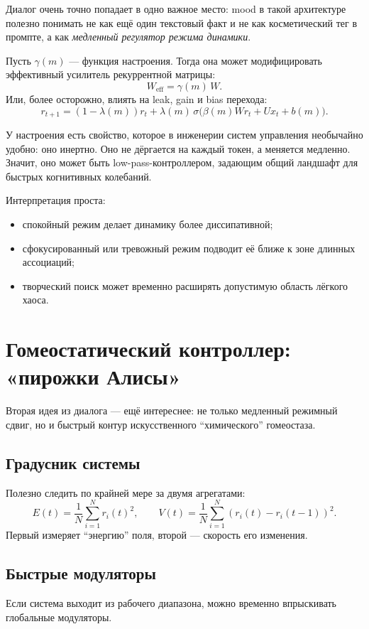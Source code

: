 Диалог очень точно попадает в одно важное место: mood в такой архитектуре полезно
понимать не как ещё один текстовый факт и не как косметический тег в промпте, а как
\emph{медленный регулятор режима динамики}.

Пусть $\gamma(m)$ — функция настроения. Тогда она может модифицировать эффективный
усилитель рекуррентной матрицы:
\[
W_{\mathrm{eff}} = \gamma(m)\,W.
\]
Или, более осторожно, влиять на leak, gain и bias перехода:
\[
r_{t+1}
=(1-\lambda(m))r_t
 + \lambda(m)\,\sigma\!\bigl(\beta(m)Wr_t + Ux_t + b(m)\bigr).
\]

\begin{intuition}
У настроения есть свойство, которое в инженерии систем управления необычайно удобно:
оно инертно. Оно не дёргается на каждый токен, а меняется медленно. Значит, оно может
быть low-pass-контроллером, задающим общий ландшафт для быстрых когнитивных колебаний.
\end{intuition}

Интерпретация проста:
\begin{itemize}
\item спокойный режим делает динамику более диссипативной;
\item сфокусированный или тревожный режим подводит её ближе к зоне длинных ассоциаций;
\item творческий поиск может временно расширять допустимую область лёгкого хаоса.
\end{itemize}

\section{Гомеостатический контроллер: «пирожки Алисы»}

Вторая идея из диалога — ещё интереснее: не только медленный режимный сдвиг, но и
быстрый контур искусственного ``химического'' гомеостаза.

\subsection*{Градусник системы}
Полезно следить по крайней мере за двумя агрегатами:
\[
E(t)=\frac{1}{N}\sum_{i=1}^N r_i(t)^2,
\qquad
V(t)=\frac{1}{N}\sum_{i=1}^N (r_i(t)-r_i(t-1))^2.
\]
Первый измеряет ``энергию'' поля, второй — скорость его изменения.

\subsection*{Быстрые модуляторы}
Если система выходит из рабочего диапазона, можно временно впрыскивать глобальные
модуляторы.

